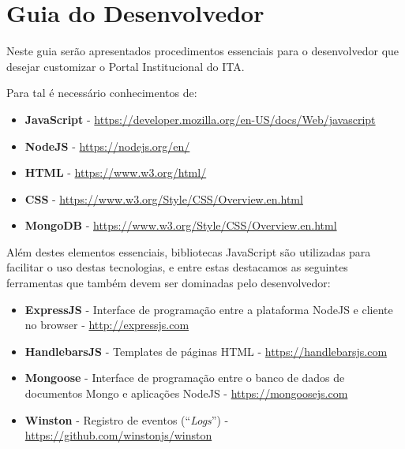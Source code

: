 \section{Guia do Desenvolvedor}\label{RS0003:developer}

Neste guia serão apresentados procedimentos essenciais para o desenvolvedor que desejar customizar o Portal Institucional do ITA.

Para tal é necessário conhecimentos de:

\begin{itemize}
    \item \textbf{JavaScript} - \href{https://developer.mozilla.org/en-US/docs/Web/javascript}{https://developer.mozilla.org/en-US/docs/Web/javascript}
    \item \textbf{NodeJS} - \href{https://nodejs.org/en/}{https://nodejs.org/en/}
    \item \textbf{HTML} - \href{https://www.w3.org/html/}{https://www.w3.org/html/}
    \item \textbf{CSS} - \href{https://www.w3.org/Style/CSS/Overview.en.html}{https://www.w3.org/Style/CSS/Overview.en.html}
    \item \textbf{MongoDB} - \href{https://www.w3.org/Style/CSS/Overview.en.html}{https://www.w3.org/Style/CSS/Overview.en.html}
\end{itemize}

Além destes elementos essenciais, bibliotecas JavaScript são utilizadas para facilitar o uso destas tecnologias, e entre estas destacamos as seguintes ferramentas que também devem ser dominadas pelo desenvolvedor:

\begin{itemize}
    \item \textbf{ExpressJS} - Interface de programação entre a plataforma NodeJS e cliente no \gls{browser} - \href{http://expressjs.com}{http://expressjs.com}
    \item \textbf{HandlebarsJS} - Templates de páginas HTML - \href{https://handlebarsjs.com}{https://handlebarsjs.com}
    \item \textbf{Mongoose} - Interface de programação entre o banco de dados de documentos Mongo e aplicações NodeJS - \href{https://mongoosejs.com}{https://mongoosejs.com}
    \item \textbf{Winston} - Registro de eventos (``\textit{Logs}'') - \href{https://github.com/winstonjs/winston}{https://github.com/winstonjs/winston}
\end{itemize}

